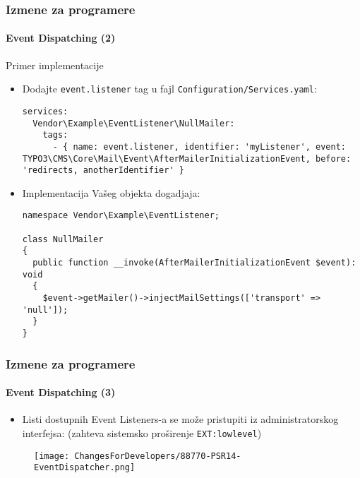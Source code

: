 \begin{frame}[fragile]
	\frametitle{Izmene za programere}
	\framesubtitle{Event Dispatching (2)}

	\lstset{basicstyle=\tiny\ttfamily}

	Primer implementacije

	\begin{itemize}\smaller
		\item[\ding{202}] Dodajte \texttt{event.listener} tag u fajl \texttt{Configuration/Services.yaml}:

\begin{lstlisting}
services:
  Vendor\Example\EventListener\NullMailer:
    tags:
      - { name: event.listener, identifier: 'myListener', event: TYPO3\CMS\Core\Mail\Event\AfterMailerInitializationEvent, before: 'redirects, anotherIdentifier' }
\end{lstlisting}

		\item[\ding{203}] Implementacija Vašeg objekta dogadjaja:

\begin{lstlisting}
namespace Vendor\Example\EventListener;

class NullMailer
{
  public function __invoke(AfterMailerInitializationEvent $event): void
  {
    $event->getMailer()->injectMailSettings(['transport' => 'null']);
  }
}
\end{lstlisting}

	\end{itemize}\normalsize

\end{frame}


\begin{frame}[fragile]
	\frametitle{Izmene za programere}
	\framesubtitle{Event Dispatching (3)}

	\lstset{basicstyle=\tiny\ttfamily}

	\begin{itemize}
		\item Listi dostupnih Event Listeners-a se može pristupiti iz administratorskog interfejsa:\newline
			\smaller
				(zahteva sistemsko proširenje \texttt{EXT:lowlevel})
			\normalsize
	\end{itemize}

	\begin{figure}
		\texttt{[image: ChangesForDevelopers/88770-PSR14-EventDispatcher.png]}
	\end{figure}

\end{frame}


